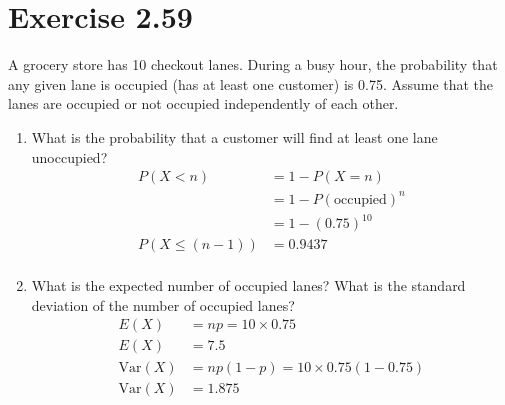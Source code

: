 \documentclass{article}
\newcommand{\var}{\text{Var}}
\begin{document}
\section*{Exercise 2.59}
	A grocery store has 10 checkout lanes. During a busy hour, the probability that any given lane is occupied (has at least one customer) is 0.75. Assume that the lanes are occupied or not occupied independently of each other.
	\begin{enumerate}[\quad(a)]
		\item What is the probability that a customer will find at least one lane unoccupied?
		\begin{align*}
			P(X < n) &= 1 - P(X = n)\\
			&= 1 - P(\text{occupied})^n\\
			&= 1 - (0.75)^{10}\\
			P(X \leq (n-1)) &= 0.9437\\
		\end{align*}
		\item What is the expected number of occupied lanes? What is the standard deviation of the number of occupied lanes?
		\begin{align*}
			E(X) &= np = 10\times 0.75\\
			E(X) &= 7.5 \\
			\var(X) &= np(1-p) = 10\times 0.75(1-0.75)\\
			\var(X) &= 1.875
		\end{align*}
	\end{enumerate}
\end{document}
